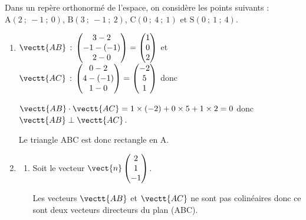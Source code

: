 \medskip

Dans un repère orthonormé de l'espace, on considère les points suivants : \hfill{}$\text{A}(2~;~-1~;~0)$, $\text{B}(3~;~-1~;~2)$, $\text{C}(0~;~4~;~1)$ et $\text{S} (0~;~1~;~4)$.\hfill{}

\smallskip

\begin{enumerate}
\item 
$\vectt{AB}\,:\,
\begin{pmatrix}
3-2 \\-1-(-1)\\2-0
\end{pmatrix}
=
\begin{pmatrix}
1\\0\\2
\end{pmatrix}$
et
$\vectt{AC}\,:\,
\begin{pmatrix}
0-2 \\4-(-1)\\1-0
\end{pmatrix}
=
\begin{pmatrix}
-2 \\5\\1
\end{pmatrix}
$
donc

$\vectt{AB}\cdot \vectt{AC} = 1\times (-2) + 0\times 5 + 1 \times 2 = 0$
donc
$\vectt{AB}\perp \vectt{AC}$.

Le triangle ABC est donc rectangle en A.

\item  
	\begin{enumerate}
		\item Soit le vecteur $\vect{n}\begin{pmatrix}2\\1\\- 1\end{pmatrix}$.

Les vecteurs $\vectt{AB}$ et $\vectt{AC}$ ne sont pas colinéaires donc ce sont deux vecteurs directeurs du plan (ABC).
		
		

\end{enumerate}
\end{enumerate}
